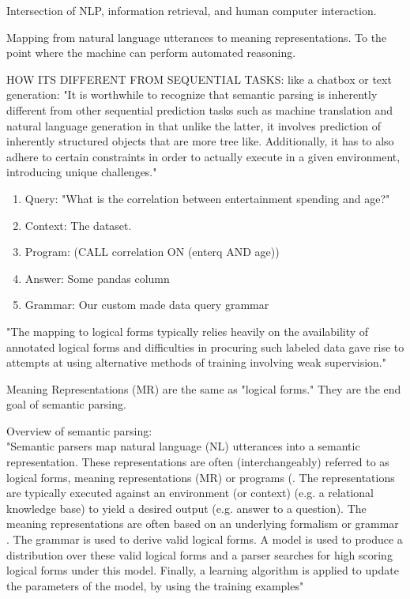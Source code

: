 \documentclass[pageno]{jpaper}
\begin{document}
Intersection of NLP, information retrieval, and human computer interaction. 

Mapping from natural language utterances to meaning representations. To the point where the machine can perform automated reasoning. 

HOW ITS DIFFERENT FROM SEQUENTIAL TASKS: like a chatbox or text generation:
"It is worthwhile to recognize that semantic parsing is inherently different from other sequential prediction tasks such as machine translation and natural language generation in that unlike the latter, it involves prediction of inherently structured objects that are more tree like. Additionally, it has to also adhere to certain constraints in order to actually execute in a given environment, introducing unique challenges."


\begin{enumerate}
\item Query: "What is the correlation between entertainment spending and age?"
\item Context: The dataset.
\item Program: (CALL correlation ON (enterq AND age))
\item Answer: Some pandas column
\item Grammar: Our custom made data query grammar
\end{enumerate}


"The mapping to logical forms typically relies heavily on the availability of annotated logical forms and difficulties in procuring such labeled data gave rise to attempts at using alternative methods of training involving weak supervision."

Meaning Representations (MR) are the same as "logical forms." They are the end goal of semantic parsing.


Overview of semantic parsing:\\
"Semantic parsers map natural language (NL) utterances into a semantic representation.
These representations are often (interchangeably) referred to as logical forms, meaning representations (MR) or programs (. The representations are typically executed against
an environment (or context) (e.g. a relational knowledge base) to yield a desired
output (e.g. answer to a question). The meaning representations are often based on an
underlying formalism or grammar . The grammar is used to derive valid logical
forms. A model is used to produce a distribution over these valid logical forms and a parser
searches for high scoring logical forms under this model. Finally, a learning algorithm
is applied to update the parameters of the model, by using the training examples"
\end{document}
